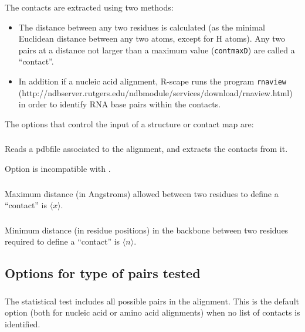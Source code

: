 \noindent
The contacts are extracted using two methods:
\begin{itemize}

\item The distance between any two residues is calculated (as the  minimal Euclidean distance between any two atoms, except
for H atoms). Any two pairs at a distance not larger than a maximum
value (\texttt{contmaxD}) are called a ``contact''.

\item In addition if a nucleic acid alignment, R-scape runs the program \texttt{rnaview}~\citep{YangWesthof03}\\
(http://ndbserver.rutgers.edu/ndbmodule/services/download/rnaview.html)
in order to identify RNA base pairs within the contacts.
\end{itemize}

\vspace{2mm}
\noindent
The options that control the input of a structure or contact map are:

\subsubsection{} Reads a pdbfile associated to the alignment, and extracts the contacts
from it.

Option  is incompatible with .

\subsubsection{} Maximum distance (in Angstroms) allowed between two residues to define a ``contact'' is $\langle x\rangle$.

\subsubsection{} Minimum distance (in residue positions) in the backbone between two residues required to define a ``contact'' is $\langle n\rangle$.

\subsection{Options for type of pairs tested}

\subsubsection{}
The statistical test includes all possible pairs in the alignment.
This is the default option (both for nucleic acid or amino acid
alignments) when no list of contacts is identified. 


